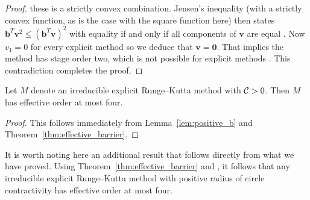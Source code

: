 \begin{proof}
  these is a strictly convex combination.
  Jensen's inequality (with a strictly convex function, as is the case with the
  square function here) then states $\bm{b}^T \bm{v}^2 \leq (\bm{b}^T
  \bm{v})^2$ with equality if and only if all components of $\bm{v}$ are equal
  \cite[Theorem 12, pg 31]{Bullen:inequalities}.
  Now $v_1 = 0$ for every explicit method so we deduce that $\bm{v}=\bm{0}$.
  That implies the method has stage order two, which is not possible for
  explicit methods \cite{Ruuth2002}.
  This contradiction completes the proof.
\end{proof}

\begin{corollary}\label{cor:no_SSP_5}
    Let $M$ denote an irreducible explicit Runge--Kutta method with $\mathcal{C}>0$.
    Then $M$ has effective order at most four.
\end{corollary}
\begin{proof}
	This follows immediately from Lemma~\ref{lem:positive_b} and 
	Theorem~\ref{thm:effective_barrier}.
\end{proof}

\begin{remark}
    It is worth noting here an additional result that 
    follows directly from what we have proved.
    Using Theorem~\ref{thm:effective_barrier} and \cite[Theorem~4.1]{dahlquist2006}, 
    it follows that any irreducible explicit Runge--Kutta method with positive radius of
    circle contractivity has effective order at most four.
\end{remark}


